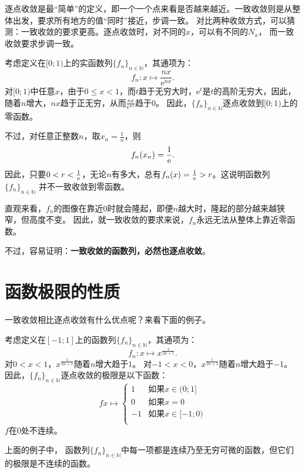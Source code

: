 \documentclass[12pt,UTF8]{ctexbook}
\begin{document}
逐点收敛是最“简单”的定义，即一个一个点来看是否越来越近。一致收敛则是从整体出发，要求所有地方的值“同时”接近，步调一致。
对比两种收敛方式，可以猜测：一致收敛的要求更高。逐点收敛时，对不同的$x$，可以有不同的$N_x$，
而一致收敛要求步调一致。

\begin{ex}
    考虑定义在$[0;1)$上的实函数列$\{f_n\}_{n\in\mathbb{N}}$，其通项为：
    $$ f_n: x \mapsto \frac{nx}{\mathrm{e}^{nx}}. $$
    对$[0;1)$中任意$x$，由于$0\leqslant x<1$，而$t$趋于无穷大时，$\mathrm{e}^t$是$t$的高阶无穷大，因此，随着$n$增大，$nx$趋于正无穷，从而$\frac{nx}{\mathrm{e}^{nx}}$趋于$0$。
    因此，$\{f_n\}_{n\in\mathbb{N}}$逐点收敛到$[0;1)$上的零函数。

    不过，对任意正整数$n$，取$x_n = \frac{1}{n}$，则
    $$f_n(x_n) = \frac{1}{\mathrm{e}}.$$
    因此，只要$0<r <\frac{1}{\mathrm{e}}$，无论$n$有多大，总有$f_n(x) = \frac{1}{\mathrm{e}} > r$。这说明函数列$\{f_n\}_{n\in\mathbb{N}}$
    并不一致收敛到零函数。
    
    直观来看，$f_n$的图像在靠近$0$时就会隆起，即便$n$越大时，隆起的部分越来越狭窄，但高度不变。
    因此，就一致收敛的要求来说，$f_n$永远无法从整体上靠近零函数。

\end{ex}

不过，容易证明：\textbf{一致收敛的函数列，必然也逐点收敛}。



\section{函数极限的性质}

一致收敛相比逐点收敛有什么优点呢？来看下面的例子。

\begin{ex}
    考虑定义在$[-1;1]$上的函数列$\{f_n\}_{n\in\mathbb{N}}$，其通项为：
    $$ f_n: x \mapsto x^{\frac{1}{2n+1}}. $$
    对$0<x<1$，$x^{\frac{1}{2n+1}}$随着$n$增大趋于$1$。
    对$-1<x<0$，$x^{\frac{1}{2n+1}}$随着$n$增大趋于$-1$。
    因此，$\{f_n\}_{n\in\mathbb{N}}$逐点收敛的极限是以下函数：
    $$
    f x\mapsto \left\{
        \begin{array}{ll}
            1 & \mbox{如果} x \in (0; 1] \\
            0 & \mbox{如果} x = 0 \\
            -1 & \mbox{如果} x \in [-1; 0) \\
        \end{array}
    \right.
    $$
    $f$在$0$处不连续。
\end{ex}
上面的例子中，
函数列$\{f_n\}_{n\in\mathbb{N}}$中每一项都是连续乃至无穷可微的函数，但它们的极限是不连续的函数。
\end{document}
